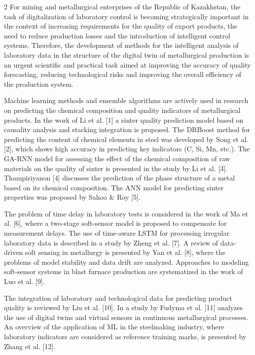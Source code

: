 \begin{multicols}{2}
For mining and metallurgical enterprises of the Republic of Kazakhstan,
the task of digitalization of laboratory control is becoming
strategically important in the context of increasing requirements for
the quality of export products, the need to reduce production losses and
the introduction of intelligent control systems. Therefore, the
development of methods for the intelligent analysis of laboratory data
in the structure of the digital twin of metallurgical production is an
urgent scientific and practical task aimed at improving the accuracy of
quality forecasting, reducing technological risks and improving the
overall efficiency of the production system.

Machine learning methods and ensemble algorithms are actively used in
research on predicting the chemical composition and quality indicators
of metallurgical products. In the work of Li et al. {[}1{]} a sinter
quality prediction model based on causality analysis and stacking
integration is proposed. The DRBoost method for predicting the content
of chemical elements in steel was developed by Song et al. {[}2{]},
which shows high accuracy in predicting key indicators (C, Si, Mn,
etc.). The GA-RNN model for assessing the effect of the chemical
composition of raw materials on the quality of sinter is presented in
the study by Li et al. {[}3{]}. Thampiriyanon {[}4{]} discusses the
prediction of the phase structure of a metal based on its chemical
composition. The ANN model for predicting sinter properties was proposed
by Sahoo \& Roy {[}5{]}.

The problem of time delay in laboratory tests is considered in the work
of Ma et al. {[}6{]}, where a two-stage soft-sensor model is proposed to
compensate for measurement delays. The use of time-aware LSTM for
processing irregular laboratory data is described in a study by Zheng et
al. {[}7{]}. A review of data-driven soft sensing in metallurgy is
presented by Yan et al. {[}8{]}, where the problems of model stability
and data drift are analyzed. Approaches to modeling soft-sensor systems
in blast furnace production are systematized in the work of Luo et al.
{[}9{]}.

The integration of laboratory and technological data for predicting
product quality is reviewed by Liu et al. {[}10{]}. In a study by Fudyma
et al. {[}11{]} analyzes the use of digital twins and virtual sensors in
continuous metallurgical processes. An overview of the application of ML
in the steelmaking industry, where laboratory indicators are considered
as reference training marks, is presented by Zhang et al. {[}12{]}.


\end{multicols}
